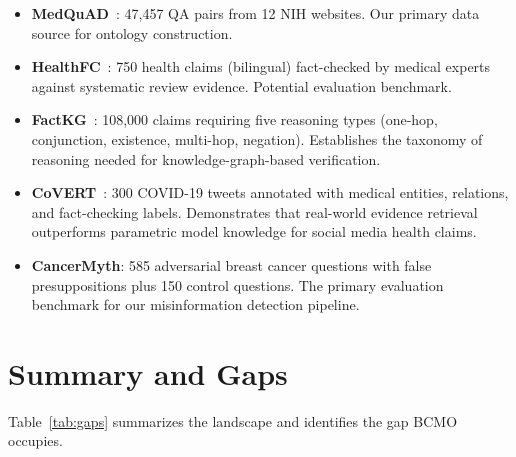 \documentclass[11pt,a4paper]{article}
\begin{document}
\begin{itemize}
    \item \textbf{MedQuAD}~\cite{benabacha2019}: 47,457 QA pairs from 12 NIH websites. Our primary data source for ontology construction.
    \item \textbf{HealthFC}~\cite{vladika2024healthfc}: 750 health claims (bilingual) fact-checked by medical experts against systematic review evidence. Potential evaluation benchmark.
    \item \textbf{FactKG}~\cite{kim2023factkg}: 108,000 claims requiring five reasoning types (one-hop, conjunction, existence, multi-hop, negation). Establishes the taxonomy of reasoning needed for knowledge-graph-based verification.
    \item \textbf{CoVERT}~\cite{mohr2022covert}: 300 COVID-19 tweets annotated with medical entities, relations, and fact-checking labels. Demonstrates that real-world evidence retrieval outperforms parametric model knowledge for social media health claims.
    \item \textbf{CancerMyth}: 585 adversarial breast cancer questions with false presuppositions plus 150 control questions. The primary evaluation benchmark for our misinformation detection pipeline.
\end{itemize}

\section{Summary and Gaps}

Table~\ref{tab:gaps} summarizes the landscape and identifies the gap BCMO occupies.
\end{document}
